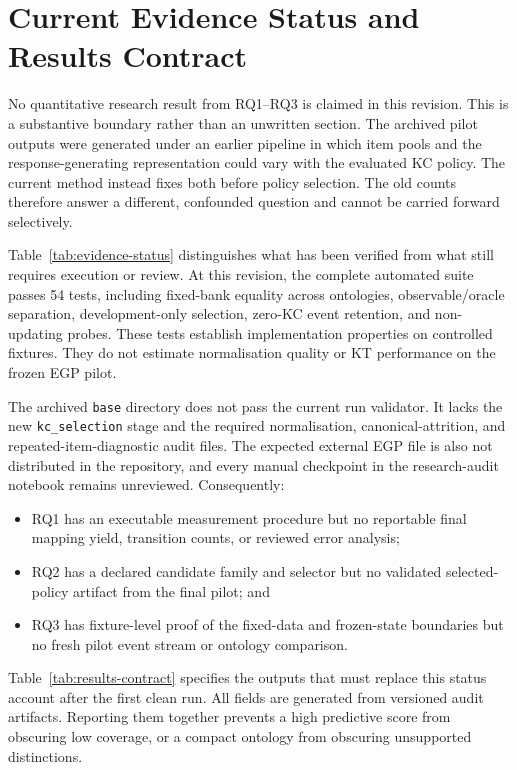 \section{Current Evidence Status and Results Contract}
\label{sec:results}

No quantitative research result from RQ1--RQ3 is claimed in this revision.
This is a substantive boundary rather than an unwritten section.  The archived
pilot outputs were generated under an earlier pipeline in which item pools and
the response-generating representation could vary with the evaluated KC
policy.  The current method instead fixes both before policy selection.  The
old counts therefore answer a different, confounded question and cannot be
carried forward selectively.

Table~\ref{tab:evidence-status} distinguishes what has been verified from what
still requires execution or review.  At this revision, the complete automated
suite passes 54 tests, including fixed-bank equality across ontologies,
observable/oracle separation, development-only selection, zero-KC event
retention, and non-updating probes.  These tests establish implementation
properties on controlled fixtures.  They do not estimate normalisation quality
or KT performance on the frozen EGP pilot.



The archived \texttt{base} directory does not pass the current run validator.
It lacks the new \texttt{kc\_selection} stage and the required normalisation,
canonical-attrition, and repeated-item-diagnostic audit files.  The expected
external EGP file is also not distributed in the repository, and every manual
checkpoint in the research-audit notebook remains unreviewed.  Consequently:

\begin{itemize}
  \item RQ1 has an executable measurement procedure but no reportable final
        mapping yield, transition counts, or reviewed error analysis;
  \item RQ2 has a declared candidate family and selector but no validated
        selected-policy artifact from the final pilot; and
  \item RQ3 has fixture-level proof of the fixed-data and frozen-state
        boundaries but no fresh pilot event stream or ontology comparison.
\end{itemize}

Table~\ref{tab:results-contract} specifies the outputs that must replace this
status account after the first clean run.  All fields are generated from
versioned audit artifacts.  Reporting them together prevents a high predictive
score from obscuring low coverage, or a compact ontology from obscuring
unsupported distinctions.


